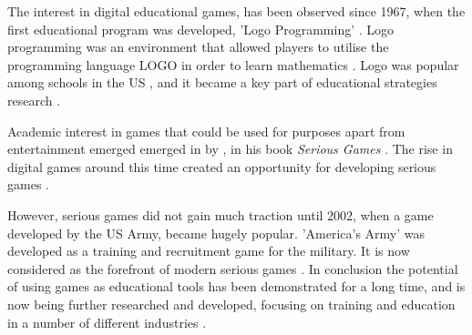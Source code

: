 \documentclass[a4paper,11.5pt]{report}
\numberwithin{figure}{section}
\numberwithin{table}{section}
\numberwithin{equation}{section}
\numberwithin{equation}{section}
\begin{document}


The interest in digital educational games, has been observed since 1967, when the first educational program was developed, 'Logo Programming' \citep{hayes2008} . Logo programming was an environment that allowed players to utilise the programming language LOGO in order to learn mathematics \citep{feurzeig1969}. Logo was popular among schools in the US \citep{lehrer1986}, and it became a key part of educational strategies research \citep{hayes2008}. 

Academic interest in games that could be used for purposes apart from entertainment emerged emerged in \citeyear{abt1970} by \citeauthor{abt1970}, in his book \textit{Serious Games} \citep{Breuer2010}. The rise in digital games around this time created an opportunity for developing serious games \citep{Wilkinson2016}. 

However, serious games did not gain much traction until 2002, when a game developed by the US Army, became hugely popular. 'America's Army' was developed as a training and recruitment game for the military. It is now considered as the forefront of modern serious games \citep{Zyda2005, Wilkinson2016}. In conclusion the potential of using games as educational tools has been demonstrated for a long time, and is now being further researched and developed, focusing on training and education in a number of different industries \citep{Wilkinson2016}.


 
\end{document}
